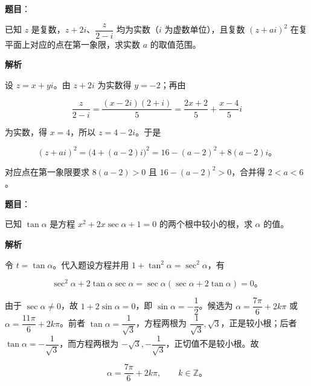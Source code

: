 \begin{answer}

\textbf{题目}：

已知 $z$ 是复数，$z+2i$、$\dfrac{z}{2-i}$ 均为实数（$i$ 为虚数单位），且复数 $(z+ai)^2$ 在复平面上对应的点在第一象限，求实数 $a$ 的取值范围。

\textbf{解析}

设 $z=x+yi$。由 $z+2i$ 为实数得 $y=-2$；再由

\nopagebreak[4]
\[
\frac{z}{2-i}=\frac{(x-2i)(2+i)}5
=\frac{2x+2}{5}+\frac{x-4}{5}i
\]

为实数，得 $x=4$，所以 $z=4-2i$。于是

\nopagebreak[4]
\[
(z+ai)^2=\bigl(4+(a-2)i\bigr)^2
=16-(a-2)^2+8(a-2)i\text{。}
\]

对应点在第一象限要求 $8(a-2)>0$ 且 $16-(a-2)^2>0$，合并得 $2<a<6$。


\end{answer}
\begin{answer}

\textbf{题目}：

已知 $\tan\alpha$ 是方程 $x^2+2x\sec\alpha+1=0$ 的两个根中较小的根，求 $\alpha$ 的值。

\textbf{解析}

令 $t=\tan\alpha$。代入题设方程并用 $1+\tan^2\alpha=\sec^2\alpha$，有

\nopagebreak[4]
\[
\sec^2\alpha+2\tan\alpha\sec\alpha
=\sec\alpha(\sec\alpha+2\tan\alpha)=0\text{。}
\]

由于 $\sec\alpha\ne0$，故 $1+2\sin\alpha=0$，即 $\sin\alpha=-\dfrac12$。候选为 $\alpha=\dfrac{7\pi}{6}+2k\pi$ 或 $\alpha=\dfrac{11\pi}{6}+2k\pi$。前者 $\tan\alpha=\dfrac1{\sqrt3}$，方程两根为 $\dfrac1{\sqrt3},\sqrt3$，正是较小根；后者 $\tan\alpha=-\dfrac1{\sqrt3}$，而方程两根为 $-\sqrt3,-\dfrac1{\sqrt3}$，正切值不是较小根。故

\nopagebreak[4]
\[
\alpha=\frac{7\pi}{6}+2k\pi,\qquad k\in\mathbb Z\text{。}
\]


\end{answer}
